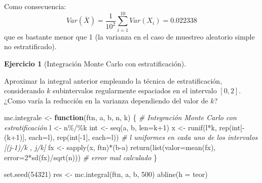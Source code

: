 \documentclass[
]{book}
\newenvironment{Shaded}{\begin{snugshade}}{\end{snugshade}}
\newcommand{\AttributeTok}[1]{\textcolor[rgb]{0.77,0.63,0.00}{#1}}
\newcommand{\CommentTok}[1]{\textcolor[rgb]{0.56,0.35,0.01}{\textit{#1}}}
\newcommand{\ControlFlowTok}[1]{\textcolor[rgb]{0.13,0.29,0.53}{\textbf{#1}}}
\newcommand{\DecValTok}[1]{\textcolor[rgb]{0.00,0.00,0.81}{#1}}
\newcommand{\FunctionTok}[1]{\textcolor[rgb]{0.00,0.00,0.00}{#1}}
\newcommand{\NormalTok}[1]{#1}
\newcommand{\OtherTok}[1]{\textcolor[rgb]{0.56,0.35,0.01}{#1}}
\newcommand{\SpecialCharTok}[1]{\textcolor[rgb]{0.00,0.00,0.00}{#1}}
\theoremstyle{break}
\theoremstyle{definition}
\theoremstyle{definition}
\theoremstyle{definition}
\newtheorem{exercise}{Ejercicio}[chapter]
\theoremstyle{definition}
\theoremstyle{remark}
\begin{document}
Como consecuencia:
\[Var\left(  \overline{X}\right)  =\frac{1}{10^{2}}\sum_{i=1}^{10}
Var\left( X_{i} \right)  = 0.022338\]
que es bastante menor que 1 (la varianza en el caso de muestreo aleatorio simple no estratificado).

\begin{exercise}[Integración Monte Carlo con estratificación]
\protect\hypertarget{exr:mc-integrale}{}{\label{exr:mc-integrale} {} }
\end{exercise}

Aproximar la integral anterior empleando la técnica de estratificación, considerando \(k\) subintervalos regularmente espaciados en el intervalo \(\left[ 0, 2 \right]\).
¿Como varía la reducción en la varianza dependiendo del valor de \(k\)?

\begin{Shaded}
\begin{Highlighting}[]
\NormalTok{mc.integrale }\OtherTok{\textless{}{-}} \ControlFlowTok{function}\NormalTok{(ftn, a, b, n, k) \{}
  \CommentTok{\# Integración Monte Carlo con estratificación}
\NormalTok{  l }\OtherTok{\textless{}{-}}\NormalTok{ n}\SpecialCharTok{\%/\%}\NormalTok{k}
\NormalTok{  int }\OtherTok{\textless{}{-}} \FunctionTok{seq}\NormalTok{(a, b, }\AttributeTok{len=}\NormalTok{k}\SpecialCharTok{+}\DecValTok{1}\NormalTok{)}
\NormalTok{  x }\OtherTok{\textless{}{-}} \FunctionTok{runif}\NormalTok{(l}\SpecialCharTok{*}\NormalTok{k, }\FunctionTok{rep}\NormalTok{(int[}\SpecialCharTok{{-}}\NormalTok{(k}\SpecialCharTok{+}\DecValTok{1}\NormalTok{)], }\AttributeTok{each=}\NormalTok{l), }\FunctionTok{rep}\NormalTok{(int[}\SpecialCharTok{{-}}\DecValTok{1}\NormalTok{], }\AttributeTok{each=}\NormalTok{l))}
  \CommentTok{\# l uniformes en cada uno de los intervalos [(j{-}1)/k , j/k]}
\NormalTok{  fx }\OtherTok{\textless{}{-}} \FunctionTok{sapply}\NormalTok{(x, ftn)}\SpecialCharTok{*}\NormalTok{(b}\SpecialCharTok{{-}}\NormalTok{a)}
  \FunctionTok{return}\NormalTok{(}\FunctionTok{list}\NormalTok{(}\AttributeTok{valor=}\FunctionTok{mean}\NormalTok{(fx), }\AttributeTok{error=}\DecValTok{2}\SpecialCharTok{*}\FunctionTok{sd}\NormalTok{(fx)}\SpecialCharTok{/}\FunctionTok{sqrt}\NormalTok{(n)))   }\CommentTok{\# error mal calculado}
\NormalTok{\}}

\FunctionTok{set.seed}\NormalTok{(}\DecValTok{54321}\NormalTok{)}
\NormalTok{res }\OtherTok{\textless{}{-}} \FunctionTok{mc.integral}\NormalTok{(ftn, a, b, }\DecValTok{500}\NormalTok{)}
\FunctionTok{abline}\NormalTok{(}\AttributeTok{h =}\NormalTok{ teor)}
\end{Highlighting}
\end{Shaded}
\end{document}
